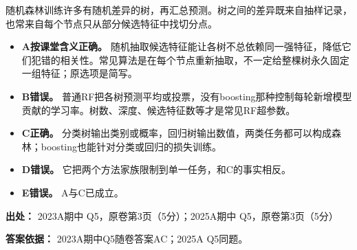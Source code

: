 随机森林训练许多有随机差异的树，再汇总预测。树之间的差异既来自抽样记录，也常来自每个节点只从部分候选特征中找切分点。



\begin{itemize}

\item \textbf{A按课堂含义正确。} 随机抽取候选特征能让各树不总依赖同一强特征，降低它们犯错的相关性。常见算法是在每个节点重新抽取，不一定给整棵树永久固定一组特征；原选项是简写。

\item \textbf{B错误。} 普通RF把各树预测平均或投票，没有boosting那种控制每轮新增模型贡献的学习率。树数、深度、候选特征数等才是常见RF超参数。

\item \textbf{C正确。} 分类树输出类别或概率，回归树输出数值，两类任务都可以构成森林；boosting也能针对分类或回归的损失训练。

\item \textbf{D错误。} 它把两个方法家族限制到单一任务，和C的事实相反。

\item \textbf{E错误。} A与C已成立。

\end{itemize}


\textbf{出处：} 2023A期中 Q5，原卷第3页（5分）；2025A期中 Q5，原卷第3页（5分）


\textbf{答案依据：} 2023A期中Q5随卷答案AC；2025A Q5同题。
